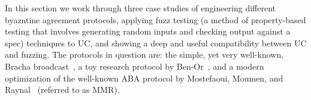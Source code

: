 
In this section we work through three case studies of engineering different byazntine agreement protocols, applying fuzz testing (a method of property-based testing that involves generating random inputs and checking output against a spec) techniques to UC, and showing a deep and useful compatibility between UC and fuzzing.
The protocols in question are: the simple, yet very well-known, Bracha broadcast~\cite{bracha}, a toy research protocol by Ben-Or~\cite{benor}, and a modern optimization of the well-known ABA protocol by Mostefaoui, Moumen, and Raynal~\cite{mmr,aba} (referred to as MMR).

